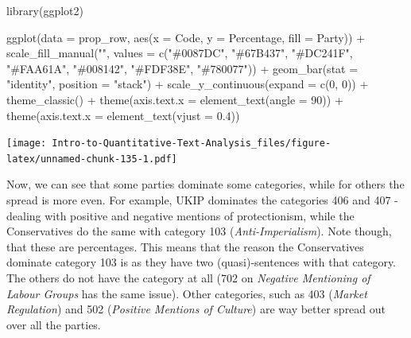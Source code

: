 \documentclass[
]{article}
\newenvironment{Shaded}{\begin{snugshade}}{\end{snugshade}}
\newcommand{\AttributeTok}[1]{\textcolor[rgb]{0.77,0.63,0.00}{#1}}
\newcommand{\DecValTok}[1]{\textcolor[rgb]{0.00,0.00,0.81}{#1}}
\newcommand{\FloatTok}[1]{\textcolor[rgb]{0.00,0.00,0.81}{#1}}
\newcommand{\FunctionTok}[1]{\textcolor[rgb]{0.00,0.00,0.00}{#1}}
\newcommand{\NormalTok}[1]{#1}
\newcommand{\SpecialCharTok}[1]{\textcolor[rgb]{0.00,0.00,0.00}{#1}}
\newcommand{\StringTok}[1]{\textcolor[rgb]{0.31,0.60,0.02}{#1}}
\begin{document}
\begin{Shaded}
\begin{Highlighting}[]
\FunctionTok{library}\NormalTok{(ggplot2)}

\FunctionTok{ggplot}\NormalTok{(}\AttributeTok{data =}\NormalTok{ prop\_row, }\FunctionTok{aes}\NormalTok{(}\AttributeTok{x =}\NormalTok{ Code, }\AttributeTok{y =}\NormalTok{ Percentage, }\AttributeTok{fill =}\NormalTok{ Party)) }\SpecialCharTok{+}
    \FunctionTok{scale\_fill\_manual}\NormalTok{(}\StringTok{""}\NormalTok{, }\AttributeTok{values =} \FunctionTok{c}\NormalTok{(}\StringTok{"\#0087DC"}\NormalTok{, }\StringTok{"\#67B437"}\NormalTok{, }\StringTok{"\#DC241F"}\NormalTok{,}
        \StringTok{"\#FAA61A"}\NormalTok{, }\StringTok{"\#008142"}\NormalTok{, }\StringTok{"\#FDF38E"}\NormalTok{, }\StringTok{"\#780077"}\NormalTok{)) }\SpecialCharTok{+} \FunctionTok{geom\_bar}\NormalTok{(}\AttributeTok{stat =} \StringTok{"identity"}\NormalTok{,}
    \AttributeTok{position =} \StringTok{"stack"}\NormalTok{) }\SpecialCharTok{+} \FunctionTok{scale\_y\_continuous}\NormalTok{(}\AttributeTok{expand =} \FunctionTok{c}\NormalTok{(}\DecValTok{0}\NormalTok{, }\DecValTok{0}\NormalTok{)) }\SpecialCharTok{+}
    \FunctionTok{theme\_classic}\NormalTok{() }\SpecialCharTok{+} \FunctionTok{theme}\NormalTok{(}\AttributeTok{axis.text.x =} \FunctionTok{element\_text}\NormalTok{(}\AttributeTok{angle =} \DecValTok{90}\NormalTok{)) }\SpecialCharTok{+}
    \FunctionTok{theme}\NormalTok{(}\AttributeTok{axis.text.x =} \FunctionTok{element\_text}\NormalTok{(}\AttributeTok{vjust =} \FloatTok{0.4}\NormalTok{))}
\end{Highlighting}
\end{Shaded}

\texttt{[image: Intro-to-Quantitative-Text-Analysis\_files/figure-latex/unnamed-chunk-135-1.pdf]}

Now, we can see that some parties dominate some categories, while for others the spread is more even. For example, UKIP dominates the categories 406 and 407 - dealing with positive and negative mentions of protectionism, while the Conservatives do the same with category 103 (\emph{Anti-Imperialism}). Note though, that these are percentages. This means that the reason the Conservatives dominate category 103 is as they have two (quasi)-sentences with that category. The others do not have the category at all (702 on \emph{Negative Mentioning of Labour Groups} has the same issue). Other categories, such as 403 (\emph{Market Regulation}) and 502 (\emph{Positive Mentions of Culture}) are way better spread out over all the parties.
\end{document}
